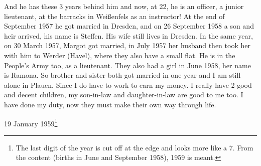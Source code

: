 \documentclass[a5paper,11pt,openany]{book}
\newcommand{\seite}[1]{\leavevmode\marginpar{\footnotesize\itshape\raggedright #1}\ignorespaces}
\begin{document}
And he has these 3 years behind him and now, at 22, he is an officer,
  a junior lieutenant, at the barracks in Weißenfels as an instructor!
At the end of September 1957 he got married in Dresden, and on 26 September 1958 a son and heir arrived,
  his name is Steffen.
His wife still lives in Dresden.
In the same year, on 30 March 1957, Margot got married, in July 1957 her husband then took her with him to
\seite{75}
Werder (Havel), where they also have a small flat.
He is in the People's Army too, as a lieutenant.
They also had a girl in June 1958, her name is Ramona.
So brother and sister both got married in one year and I am still alone in Plauen.
Since I do have to work to earn my money.
I really have 2 good and decent children, my son-in-law and daughter-in-law are good to me too.
I have done my duty, now they must make their own way through life.
\par\medskip\hfill 19 January 1959\footnote{The last digit of the year is cut off at the edge and looks more like a 7. From the content (births in June and September 1958), 1959 is meant.}
\end{document}
